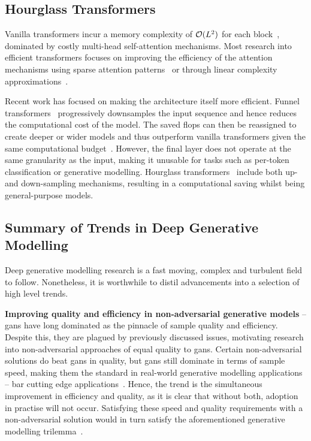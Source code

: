 \subsection{Hourglass Transformers}
\label{subsec:hourglass}

Vanilla transformers incur a memory complexity of $\mathcal{O}(L^2)$ for each
block~\cite{vaswani2017attention}, dominated by costly multi-head self-attention
mechanisms. Most research into efficient transformers focuses on improving the
efficiency of the attention mechanisms using sparse attention
patterns~\cite{child2019generating} or through linear complexity
approximations~\cite{xiong2021nystromformer}.

Recent work has focused on making the architecture itself more efficient. Funnel
transformers~\cite{dai2020funneltransformer} progressively downsamples the input
sequence and hence reduces the computational cost of the model. The saved
\glspl{flop} can then be reassigned to create deeper or wider models and thus
outperform vanilla transformers given the same computational
budget~\cite{dai2020funneltransformer}. However, the final layer does not
operate at the same granularity as the input, making it unusable for tasks such
as per-token classification or generative modelling. Hourglass
transformers~\cite{nawrot2021hierarchical} include both up- and down-sampling
mechanisms, resulting in a computational saving whilst being general-purpose
models.

\subsection{Summary of Trends in Deep Generative Modelling}
\label{subsec:trends}

Deep generative modelling research is a fast moving, complex and turbulent field
to follow. Nonetheless, it is worthwhile to distil advancements into a
selection of high level trends.

\textbf{Improving quality and efficiency in non-adversarial generative models} -- 
\Glspl{gan} have long dominated as the pinnacle of sample quality and
efficiency. Despite this, they are plagued by previously discussed issues,
motivating research into non-adversarial approaches of equal quality to
\glspl{gan}. Certain non-adversarial solutions do beat \glspl{gan} in quality,
but \glspl{gan} still dominate in terms of sample speed, making them the
standard in real-world generative modelling applications -- bar cutting
edge applications~\cite{ramesh2021dalle,ramesh2022dalle2}. Hence, the trend is
the simultaneous improvement in efficiency and quality, as it is clear that
without both, adoption in practise will not occur. Satisfying these speed and
quality requirements with a non-adversarial solution would in turn satisfy the
aforementioned generative modelling trilemma~\cite{xiao2021trilemma}.

